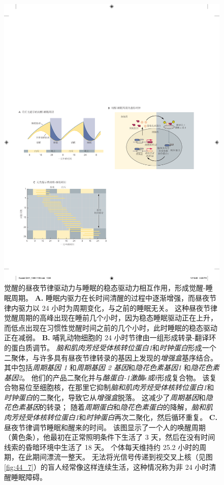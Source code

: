 \begin{figure}[htbp]
	\centering
	\includegraphics[width=0.85\linewidth]{chap44/fig_44_6}
	\caption{觉醒的昼夜节律驱动力与睡眠的稳态驱动力相互作用，形成觉醒-睡眠周期。
		\textbf{A.} 睡眠内驱力在长时间清醒的过程中逐渐增强，而昼夜节律内驱力以 24 小时为周期变化，与之前的睡眠无关。
		这种昼夜节律觉醒周期的高峰出现在睡前几个小时，因为稳态睡眠驱动正在上升，而低点出现在习惯性觉醒时间之前的几个小时，此时睡眠的稳态驱动正在减弱。
		\textbf{B.} 哺乳动物细胞的 24 小时节律由一组形成转录-翻译环的蛋白质调节。
		\textit{脑和肌肉芳烃受体核转位蛋白1}和\textit{时钟蛋白}形成一个二聚体，与许多具有昼夜节律转录的基因上发现的\textit{增强盒}基序结合。
		其中包括\textit{周期基因 1} 和\textit{周期基因 2 基因}和\textit{隐花色素基因1} 和\textit{隐花色素基因2}。
		他们的产品二聚化并与\textit{酪蛋白-1激酶$\epsilon$或$\delta$}形成复合物。
		该复合物易位至细胞核，在那里它抑制\textit{脑和肌肉芳烃受体核转位蛋白1}和\textit{时钟蛋白}的二聚化，导致它从\textit{增强盒}脱落。
		这减少了\textit{周期基因}和\textit{隐花色素基因}的转录；
		随着\textit{周期蛋白}和\textit{隐花色素蛋白}的降解，\textit{脑和肌肉芳烃受体核转位蛋白1}和\textit{时钟蛋白}再次二聚化，然后循环重复。
		\textbf{C.} 昼夜节律调节睡眠和醒来的时间。
		该图显示了一个人的唤醒周期（黄色条），他最初在正常照明条件下生活了 3 天，然后在没有时间线索的昏暗环境中生活了 18 天。
		个体每天维持约 25.2 小时的周期，在此期间漂流一整天。
		无法将光信号传递到视交叉上核（见图 \ref{fig:44_7}）的盲人经常像这样连续生活，这种情况称为非 24 小时清醒睡眠障碍。}
	\label{fig:44_6}
\end{figure}


